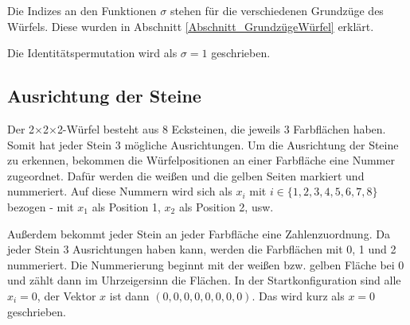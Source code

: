 \documentclass[12pt,a4paper, usenames, dvipsnames]{article}
\theoremstyle{mystyle}
\theoremstyle{definition}
\newcommand{\Ttwo}{2$\times$2$\times$2-}
\begin{document}
Die Indizes an den Funktionen $\sigma$ stehen für die verschiedenen Grundzüge des Würfels. Diese wurden in Abschnitt \ref{Abschnitt_GrundzügeWürfel} erklärt.

Die Identitätspermutation wird als $\sigma=1$ geschrieben.

%
%
%
%
%
%
%
%
%
%
%
%
%
%
%
%
%
%
%
%
\subsection{Ausrichtung der Steine} 
 \label{Abschnitt_AusrichtungDerSteine}
Der \Ttwo Würfel besteht aus 8 Ecksteinen, die jeweils 3 Farbflächen haben. Somit hat jeder Stein 3 mögliche Ausrichtungen. 
Um die Ausrichtung der Steine zu erkennen, bekommen die Würfelpositionen an einer Farbfläche eine Nummer zugeordnet. Dafür werden die weißen und die gelben Seiten markiert und nummeriert. Auf diese Nummern wird sich als $x_i$ mit $i \in \lbrace 1, 2, 3, 4, 5, 6, 7, 8 \rbrace$ bezogen - mit $x_1$ als Position 1, $x_2$ als Position 2, usw.

Außerdem bekommt jeder Stein an jeder Farbfläche eine Zahlenzuordnung. Da jeder Stein 3 Ausrichtungen haben kann, werden die Farbflächen mit 0, 1 und 2 nummeriert. Die Nummerierung beginnt mit der weißen bzw. gelben Fläche bei 0 und zählt dann im Uhrzeigersinn die Flächen. 
In der Startkonfiguration sind alle $x_i = 0$, der Vektor $x$ ist dann $(0, 0, 0, 0, 0, 0, 0, 0)$. Das wird kurz als $x=0$ geschrieben.
\end{document}
